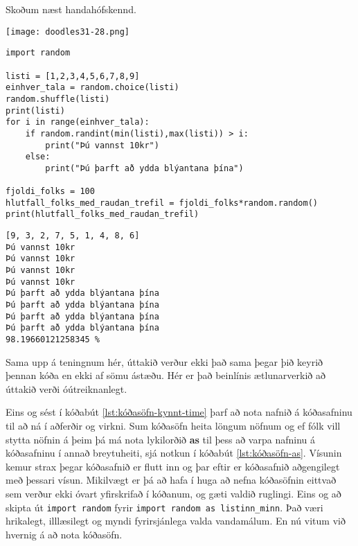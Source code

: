 Skoðum næst handahófskennd.

\phantom{easter egg}
\begin{center}
	\texttt{[image: doodles31-28.png]}
\end{center}
\phantom{}

\begin{lstlisting}[caption=Notkun kóðasafna með random, label=lst:kóðasöfn-kynnt-rand]
import random

listi = [1,2,3,4,5,6,7,8,9]
einhver_tala = random.choice(listi)
random.shuffle(listi)
print(listi)
for i in range(einhver_tala):
	if random.randint(min(listi),max(listi)) > i:
		print("Þú vannst 10kr")
	else:
		print("Þú þarft að ydda blýantana þína")

fjoldi_folks = 100
hlutfall_folks_med_raudan_trefil = fjoldi_folks*random.random()
print(hlutfall_folks_med_raudan_trefil)
\end{lstlisting}
\lstset{style=uttak}
\begin{lstlisting}
[9, 3, 2, 7, 5, 1, 4, 8, 6]
Þú vannst 10kr
Þú vannst 10kr
Þú vannst 10kr
Þú vannst 10kr
Þú þarft að ydda blýantana þína
Þú þarft að ydda blýantana þína
Þú þarft að ydda blýantana þína
Þú þarft að ydda blýantana þína
98.19660121258345 %
\end{lstlisting}
\lstset{style=venjulegt}

Sama upp á teningnum hér, úttakið verður ekki það sama þegar þið keyrið þennan kóða en ekki af sömu ástæðu.
Hér er það beinlínis ætlunarverkið að úttakið verði óútreiknanlegt.



Eins og sést í kóðabút \ref{lst:kóðasöfn-kynnt-time} þarf að nota nafnið á kóðasafninu til að ná í aðferðir og virkni.
Sum kóðasöfn heita löngum nöfnum og ef fólk vill stytta nöfnin á þeim þá má nota lykilorðið \textbf{as} til þess að varpa nafninu á kóðasafninu í annað breytuheiti, sjá notkun í kóðabút \ref{lst:kóðasöfn-as}.
Vísunin kemur strax þegar kóðasafnið er flutt inn og þar eftir er kóðasafnið aðgengilegt með þessari vísun.
Mikilvægt er þá að hafa í huga að nefna kóðasöfnin eittvað sem verður ekki óvart yfirskrifað í kóðanum, og gæti valdið ruglingi.
Eins og að skipta út \texttt{import random} fyrir \texttt{import random as listinn\_minn}.
Það væri hrikalegt, illlæsilegt og myndi fyrirsjánlega valda vandamálum.
En nú vitum við hvernig á að nota kóðasöfn.

